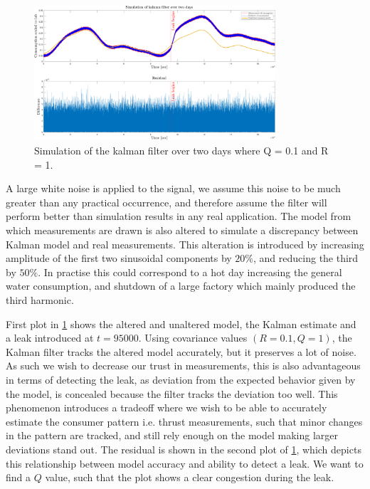 \begin{figure}[h!]
	\centering
	\includegraphics[width=0.8\textwidth]{Pictures/Kalman_and_Residual_Q01_R1.pdf}
	
	\caption{Simulation of the kalman filter over two days where Q = 0.1 and R = 1.}
	\label{fig:Kalman_residual_Q01R1}
\end{figure}


A large white noise is applied to the signal, we assume this noise to be much greater than any practical occurrence, and therefore assume the filter will perform better than simulation results in any real application. The model from which measurements are drawn is also altered to simulate a discrepancy between Kalman model and real measurements. This alteration is introduced by increasing amplitude of the first two sinusoidal components by $20\%$, and reducing the third by $50\%$. In practise this could correspond to a hot day increasing the general water consumption, and shutdown of a large factory which mainly produced the third harmonic.

First plot in \ref{fig:Kalman_residual_Q01R1} shows the altered and unaltered model, the Kalman estimate and a leak introduced at $t = 95000$. Using covariance values $(R = 0.1, Q = 1)$, the Kalman filter tracks the altered model accurately, but it preserves a lot of noise. As such we wish to decrease our trust in measurements, this is also advantageous in terms of detecting the leak, as deviation from the expected behavior given by the model, is concealed because the filter tracks the deviation too well. This phenomenon introduces a tradeoff where we wish to be able to accurately estimate the consumer pattern i.e. thrust measurements, such that minor changes in the pattern are tracked, and still rely enough on the model making larger deviations stand out. The residual is shown in the second plot of \ref{fig:Kalman_residual_Q01R1}, which depicts this relationship between model accuracy and ability to detect a leak. We want to find a $Q$ value, such that the plot shows a clear congestion during the leak. 

